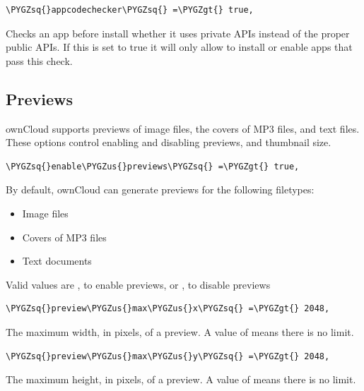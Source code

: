 \documentclass[letterpaper,10pt,english]{sphinxmanual}
\def\PYGZus{\char`\_}
\def\PYGZgt{\char`\>}
\def\PYGZsq{\char`\'}
\begin{document}
\begin{Verbatim}[commandchars=\\\{\}]
\PYGZsq{}appcodechecker\PYGZsq{} =\PYGZgt{} true,
\end{Verbatim}

Checks an app before install whether it uses private APIs instead of the
proper public APIs. If this is set to true it will only allow to install or
enable apps that pass this check.


\subsection{Previews}
\label{configuration_server/config_sample_php_parameters:previews}
ownCloud supports previews of image files, the covers of MP3 files, and text
files. These options control enabling and disabling previews, and thumbnail
size.

\begin{Verbatim}[commandchars=\\\{\}]
\PYGZsq{}enable\PYGZus{}previews\PYGZsq{} =\PYGZgt{} true,
\end{Verbatim}

By default, ownCloud can generate previews for the following filetypes:
\begin{itemize}
\item {} 
Image files

\item {} 
Covers of MP3 files

\item {} 
Text documents

\end{itemize}

Valid values are , to enable previews, or
, to disable previews

\begin{Verbatim}[commandchars=\\\{\}]
\PYGZsq{}preview\PYGZus{}max\PYGZus{}x\PYGZsq{} =\PYGZgt{} 2048,
\end{Verbatim}

The maximum width, in pixels, of a preview. A value of  means there
is no limit.

\begin{Verbatim}[commandchars=\\\{\}]
\PYGZsq{}preview\PYGZus{}max\PYGZus{}y\PYGZsq{} =\PYGZgt{} 2048,
\end{Verbatim}

The maximum height, in pixels, of a preview. A value of  means there
is no limit.
\end{document}
